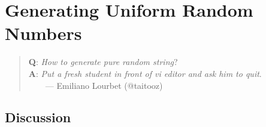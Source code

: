 \chapter{Generating Uniform Random Numbers}

\setcounter{problem}{1}

\begin{quote}
{\bf Q}: {\em How to generate pure random string}? \\
{\bf A}: {\em Put a fresh student in front of vi editor and ask him to quit}.\\
~~~~--- Emiliano Lourbet (@taitooz)
\end{quote}

\section{Discussion}

